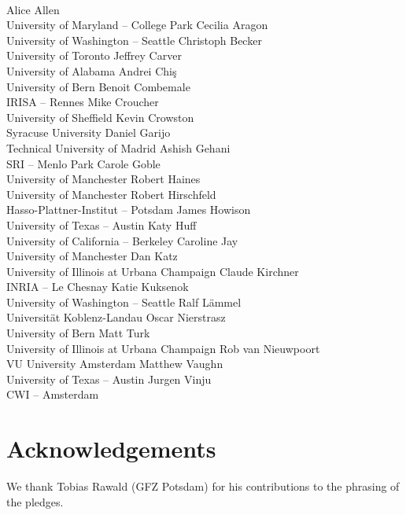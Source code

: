 \documentclass[a4paper,UKenglish]{dagman}
\begin{document}
\begin{participants}
\\
\participant Alice Allen\\ University of Maryland -- College Park
\participant Cecilia Aragon\\ University of Washington -- Seattle
\participant Christoph Becker\\ University of Toronto
\participant Jeffrey Carver\\ University of Alabama
\participant Andrei Chi\c{s}\\ University of Bern
\participant Benoit Combemale\\ IRISA -- Rennes
\participant Mike Croucher\\ University of Sheffield
\participant Kevin Crowston\\ Syracuse University
\participant Daniel Garijo\\ Technical University of Madrid
\participant Ashish Gehani\\ SRI -- Menlo Park
\participant Carole Goble\\ University of Manchester
\participant Robert Haines\\ University of Manchester
\participant Robert Hirschfeld\\ Hasso-Plattner-Institut -- Potsdam
\participant James Howison\\ University of Texas -- Austin
\participant Katy Huff\\ University of California -- Berkeley
\participant Caroline Jay\\ University of Manchester
\participant Dan Katz\\ University of Illinois at Urbana Champaign
\participant Claude Kirchner\\ INRIA -- Le Chesnay
\participant Katie Kuksenok\\ University of Washington -- Seattle
\participant Ralf L\"ammel\\ Universit\"at Koblenz-Landau
\participant Oscar Nierstrasz\\ University of Bern
\participant Matt Turk\\ University of Illinois at Urbana Champaign
\participant Rob van Nieuwpoort\\ VU University Amsterdam
\participant Matthew Vaughn\\ University of Texas -- Austin
\participant Jurgen Vinju\\ CWI -- Amsterdam
\end{participants}


\section*{Acknowledgements}

We thank Tobias Rawald (GFZ Potsdam) for his contributions to the phrasing of the pledges.


\end{document}
